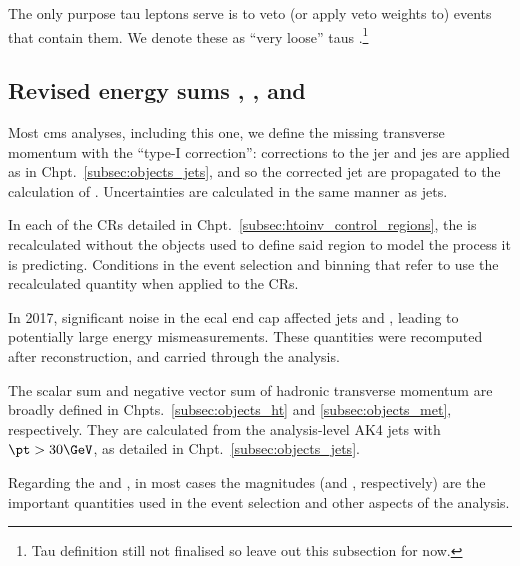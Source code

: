 The only purpose tau leptons \Ptau serve is to veto (or apply veto weights to) events that contain them. We denote these as ``very loose'' taus \vlooseTau.\footnote{Tau definition still not finalised so leave out this subsection for now.}




\subsection{Revised energy sums \texorpdfstring{\ptvecmiss}{ptmiss}, \texorpdfstring{\HT}{HT}, and \texorpdfstring{\htvecmiss}{MHT}}
\label{subsec:objects_analysis_energy_sums}

Most \acrshort{cms} analyses, including this one, we define the missing transverse momentum with the ``type-I correction'': corrections to the \acrshort{jer} and \acrshort{jes} are applied as in Chpt.~\ref{subsec:objects_jets}, and so the corrected \gls{jet} \ptvec are propagated to the calculation of \ptvecmiss. Uncertainties are calculated in the same manner as \glspl{jet}.

In each of the \glspl{CR} detailed in Chpt.~\ref{subsec:htoinv_control_regions}, the \ptvecmiss is recalculated without the objects used to define said region to model the process it is predicting. Conditions in the event selection and binning that refer to \ptmiss use the recalculated quantity when applied to the \glspl{CR}.

In 2017, significant noise in the \acrshort{ecal} end cap affected \glspl{jet} and \ptmiss, leading to potentially large energy mismeasurements. These quantities were recomputed after reconstruction, and carried through the analysis.

The scalar sum \HT and negative vector sum of hadronic transverse momentum \htvecmiss are broadly defined in Chpts.~\ref{subsec:objects_ht} and \ref{subsec:objects_met}, respectively. They are calculated from the analysis-level AK4 jets with $\pt > \text{30}\GeV$, as detailed in Chpt.~\ref{subsec:objects_jets}.

Regarding the \ptvecmiss and \htvecmiss, in most cases the magnitudes (\ptmiss and \mht, respectively) are the important quantities used in the event selection and other aspects of the analysis.


